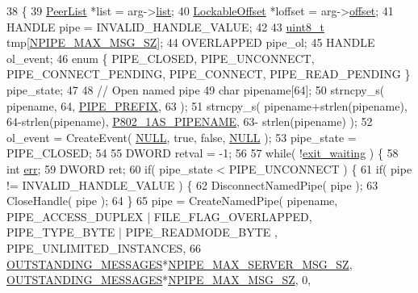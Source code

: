\begin{DoxyCode}
38                                                               \{
39     \hyperlink{class_peer_list}{PeerList} *list = arg->\hyperlink{class_i_p_c_shared_data_a0db886605e19248f347d4200c0152391}{list};
40     \hyperlink{class_lockable_offset}{LockableOffset} *loffset = arg->\hyperlink{class_i_p_c_shared_data_a8e8c05aa69387039d0ea0ecffcae87ce}{offset};
41     HANDLE pipe = INVALID\_HANDLE\_VALUE;
42 
43     \hyperlink{stdint_8h_aba7bc1797add20fe3efdf37ced1182c5}{uint8\_t} tmp[\hyperlink{windows__ipc_8hpp_a066dd79b53c24f69b77c614e4f12eb6b}{NPIPE\_MAX\_MSG\_SZ}];
44     OVERLAPPED pipe\_ol;
45     HANDLE ol\_event;
46     \textcolor{keyword}{enum} \{ PIPE\_CLOSED, PIPE\_UNCONNECT, PIPE\_CONNECT\_PENDING, PIPE\_CONNECT, PIPE\_READ\_PENDING \} pipe\_state;
47 
48     \textcolor{comment}{// Open named pipe}
49     \textcolor{keywordtype}{char} pipename[64];
50     strncpy\_s( pipename, 64, \hyperlink{windows__ipc_8hpp_ae95469fea7cc97edfa1e2d02a45a2c25}{PIPE\_PREFIX}, 63 );
51     strncpy\_s( pipename+strlen(pipename), 64-strlen(pipename), \hyperlink{windows__ipc_8hpp_ab5e537c0bda471d560b869b99671ac80}{P802\_1AS\_PIPENAME}, 63-
      strlen(pipename) );
52     ol\_event = CreateEvent( \hyperlink{openavb__types__base__pub_8h_a070d2ce7b6bb7e5c05602aa8c308d0c4}{NULL}, \textcolor{keyword}{true}, \textcolor{keyword}{false}, \hyperlink{openavb__types__base__pub_8h_a070d2ce7b6bb7e5c05602aa8c308d0c4}{NULL} );
53     pipe\_state = PIPE\_CLOSED;
54 
55     DWORD retval = -1;
56 
57     \textcolor{keywordflow}{while}( !\hyperlink{class_stoppable_ae0c3c0996c39797d309663cd3a2633d3}{exit\_waiting} ) \{
58         \textcolor{keywordtype}{int} \hyperlink{gst__avb__playbin_8c_a6ce68847c12434f60d1b2654a3dc3409}{err};
59         DWORD ret;
60         \textcolor{keywordflow}{if}( pipe\_state < PIPE\_UNCONNECT ) \{
61             \textcolor{keywordflow}{if}( pipe != INVALID\_HANDLE\_VALUE ) \{
62                 DisconnectNamedPipe( pipe );
63                 CloseHandle( pipe );
64             \}
65             pipe = CreateNamedPipe( pipename, PIPE\_ACCESS\_DUPLEX | FILE\_FLAG\_OVERLAPPED, PIPE\_TYPE\_BYTE | 
      PIPE\_READMODE\_BYTE , PIPE\_UNLIMITED\_INSTANCES,
66                 \hyperlink{windows__ipc_8hpp_a6c3bee465a747c831cfe55aced80c18b}{OUTSTANDING\_MESSAGES}*\hyperlink{windows__ipc_8hpp_a201af7e7d364550b0ef600d94cbfd635}{NPIPE\_MAX\_SERVER\_MSG\_SZ}, 
      \hyperlink{windows__ipc_8hpp_a6c3bee465a747c831cfe55aced80c18b}{OUTSTANDING\_MESSAGES}*\hyperlink{windows__ipc_8hpp_a066dd79b53c24f69b77c614e4f12eb6b}{NPIPE\_MAX\_MSG\_SZ}, 0, 

\end{DoxyCode}
